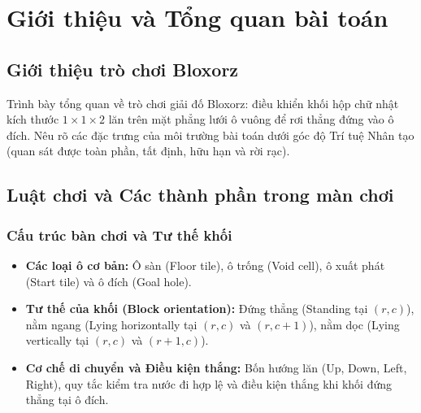 \documentclass[12pt,a4paper]{article}
\begin{document}
\tableofcontents
\newpage

\section{Giới thiệu và Tổng quan bài toán}

\subsection{Giới thiệu trò chơi Bloxorz}
Trình bày tổng quan về trò chơi giải đố Bloxorz: điều khiển khối hộp chữ nhật kích thước $1 \times 1 \times 2$ lăn trên mặt phẳng lưới ô vuông để rơi thẳng đứng vào ô đích. Nêu rõ các đặc trưng của môi trường bài toán dưới góc độ Trí tuệ Nhân tạo (quan sát được toàn phần, tất định, hữu hạn và rời rạc).

\subsection{Luật chơi và Các thành phần trong màn chơi}
\subsubsection{Cấu trúc bàn chơi và Tư thế khối}
\begin{itemize}
    \item \textbf{Các loại ô cơ bản:} Ô sàn (Floor tile), ô trống (Void cell), ô xuất phát (Start tile) và ô đích (Goal hole).
    \item \textbf{Tư thế của khối (Block orientation):} Đứng thẳng (Standing tại $(r, c)$), nằm ngang (Lying horizontally tại $(r, c)$ và $(r, c+1)$), nằm dọc (Lying vertically tại $(r, c)$ và $(r+1, c)$).
    \item \textbf{Cơ chế di chuyển và Điều kiện thắng:} Bốn hướng lăn (Up, Down, Left, Right), quy tắc kiểm tra nước đi hợp lệ và điều kiện thắng khi khối đứng thẳng tại ô đích.
\end{itemize}
\end{document}

